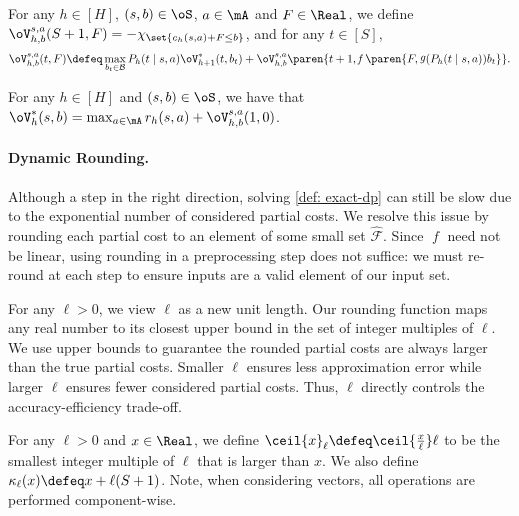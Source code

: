 \documentclass[pdftex, a4paper, 12pt]{article}
\newcommand{\round}[2]{\ceil{#2}_{#1}}
\newcommand{\mB}{\mathcal{B}}
\newcommand{\hmF}{\hat{\mathcal{F}}}
\DeclareMathOperator*{\f}{\mathit{f}}
\DeclareMathOperator*{\g}{\mathit{g}}
\begin{document}
\begin{definition}[DP]\label{def: exact-dp}
    For any $h \in [H]$, $(s,b) \in \oS$, $a \in \mA$ and $F \in \Real$, we define $\oV_{h,b}^{s,a}(S+1,F) = -\chi_{\set{c_h(s,a) + F \leq b}}$, and for any $t \in [S]$,
    \begin{equation}\label{equ: exact-dp}
    \oV_{h,b}^{s,a}(t,F) \defeq \max_{b_t \in \mB} P_h(t \mid s,a)\oV^*_{h+1}(t,b_t) + \oV_{h,b}^{s,a}\paren{t+1, \f\paren{F, \g(P_h(t \mid s,a)) b_t}}.
\end{equation}
\end{definition}

\begin{lemma}[DP Correctness]\label{lem: exact-dp}
    For any $h \in [H]$ and $(s,b) \in \oS$, we have that $\oV^*_h(s,b) = \max_{a \in \mA} r_h(s,a) + \oV^{s,a}_{h,b}(1, 0)$.
\end{lemma}

\paragraph{Dynamic Rounding.} Although a step in the right direction, solving \cref{def: exact-dp} can still be slow due to the exponential number of considered partial costs. We resolve this issue by rounding each partial cost to an element of some small set $\hmF$. Since $\f$ need not be linear, using rounding in a preprocessing step does not suffice: we must re-round at each step to ensure inputs are a valid element of our input set.

For any $\ell > 0$, we view $\ell$ as a new unit length. Our rounding function maps any real number to its closest upper bound in the set of integer multiples of $\ell$. We use upper bounds to guarantee the rounded partial costs are always larger than the true partial costs. Smaller $\ell$ ensures less approximation error while larger $\ell$ ensures fewer considered partial costs. Thus, $\ell$ directly controls the accuracy-efficiency trade-off. 

\begin{definition}\label{def: rounding}
    For any $\ell > 0$ and $x \in \Real$, we define $\round{\ell}{x} \defeq \ceil{\frac{x}{\ell}}\ell$ to be the smallest integer multiple of $\ell$ that is larger than $x$. We also define $\kappa_{\ell}(x) \defeq x + \ell(S+1)$.
    Note, when considering vectors, all operations are performed component-wise.
\end{definition}
\end{document}

